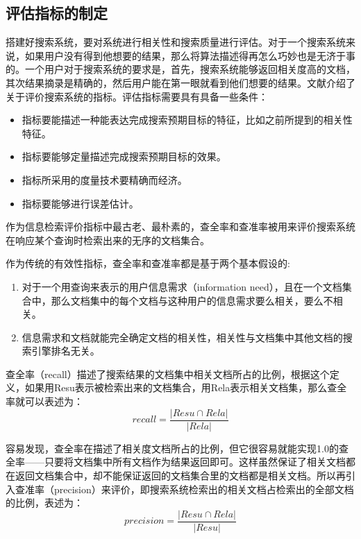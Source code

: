 \documentclass[12pt,a4paper]{article}
\begin{document}
	\subsection{评估指标的制定} 
	搭建好搜索系统，要对系统进行相关性和搜索质量进行评估。对于一个搜索系统来说，如果用户没有得到他想要的结果，那么将算法描述得再怎么巧妙也是无济于事的。一个用户对于搜索系统的要求是，首先，搜索系统能够返回相关度高的文档，其次结果摘录是精确的，然后用户能在第一眼就看到他们想要的结果。文献\cite{buttcher2010information}介绍了关于评价搜索系统的指标。评估指标需要具有具备一些条件：
	\begin{itemize}
		\item
	指标要能描述一种能表达完成搜索预期目标的特征，比如之前所提到的相关性特征。
		\item
	指标要能够定量描述完成搜索预期目标的效果。
		\item
	指标所采用的度量技术要精确而经济。
		\item
	指标要能够进行误差估计。
	\end{itemize}
	
	作为信息检索评价指标中最古老、最朴素的，查全率和查准率被用来评价搜索系统在响应某个查询时检索出来的无序的文档集合。

	作为传统的有效性指标，查全率和查准率都是基于两个基本假设的\cite{buttcher2010information}:
	\begin{enumerate}[1)]
		\item
	对于一个用查询来表示的用户信息需求（{\Times information need}），且在一个文档集合中，那么文档集中的每个文档与这种用户的信息需求要么相关，要么不相关。
		\item
	信息需求和文档就能完全确定文档的相关性，相关性与文档集中其他文档的搜索引擎排名无关。
	\end{enumerate}
	
	
	查全率（{\Times recall}）描述了搜索结果的文档集中相关文档所占的比例，根据这个定义，如果用{\Times Resu}表示被检索出来的文档集合，用{\Times Rela}表示相关文档集，那么查全率就可以表述为：
	\begin{equation}\label{eq:recall}
	recall = \frac{|Resu\cap Rela|}{|Rela|}
	\end{equation}
	
	容易发现，查全率在描述了相关度文档所占的比例，但它很容易就能实现1.0的查全率——只要将文档集中所有文档作为结果返回即可。这样虽然保证了相关文档都在返回文档集合中，却不能保证返回的文档集合里的文档都是相关文档。所以再引入查准率（{\Times precision}）来评价，即搜索系统检索出的相关文档占检索出的全部文档的比例，表述为：
	\begin{equation}\label{eq:recall}
	precision = \frac{|Resu\cap Rela|}{|Resu|}
	\end{equation}
	
\end{document}
